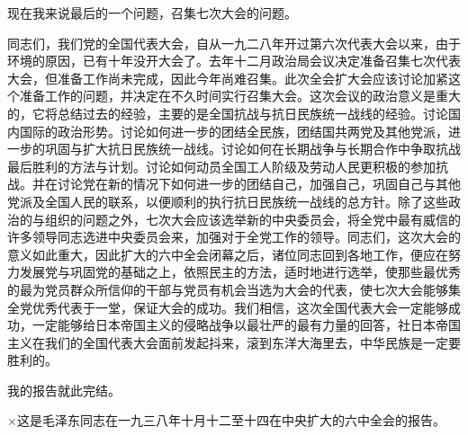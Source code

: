 现在我来说最后的一个问题，召集七次大会的问题。

同志们，我们党的全国代表大会，自从一九二八年开过第六次代表大会以来，由于环境的原因，已有十年没开大会了。去年十二月政治局会议决定准备召集七次代表大会，但准备工作尚未完成，因此今年尚难召集。此次全会扩大会应该讨论加紧这个准备工作的问题，并决定在不久时间实行召集大会。这次会议的政治意义是重大的，它将总结过去的经验，主要的是全国抗战与抗日民族统一战线的经验。讨论国内国际的政治形势。讨论如何进一步的团结全民族，团结国共两党及其他党派，进一步的巩固与扩大抗日民族统一战线。讨论如何在长期战争与长期合作中争取抗战最后胜利的方法与计划。讨论如何动员全国工人阶级及劳动人民更积极的参加抗战。并在讨论党在新的情况下如何进一步的团结自己，加强自己，巩固自己与其他党派及全国人民的联系，以便顺利的执行抗日民族统一战线的总方针。除了这些政治的与组织的问题之外，七次大会应该选举新的中央委员会，将全党中最有威信的许多领导同志选进中央委员会来，加强对于全党工作的领导。同志们，这次大会的意义如此重大，因此扩大的六中全会闭幕之后，诸位同志回到各地工作，便应在努力发展党与巩固党的基础之上，依照民主的方法，适时地进行选举，使那些最优秀的最为党员群众所信仰的干部与党员有机会当选为大会的代表，使七次大会能够集全党优秀代表于一堂，保证大会的成功。我们相信，这次全国代表大会一定能够成功，一定能够给日本帝国主义的侵略战争以最壮严的最有力量的回答，社日本帝国主义在我们的全国代表大会面前发起抖来，滚到东洋大海里去，中华民族是一定要胜利的。

我的报告就此完结。

×这是毛泽东同志在一九三八年十月十二至十四在中央扩大的六中全会的报告。

